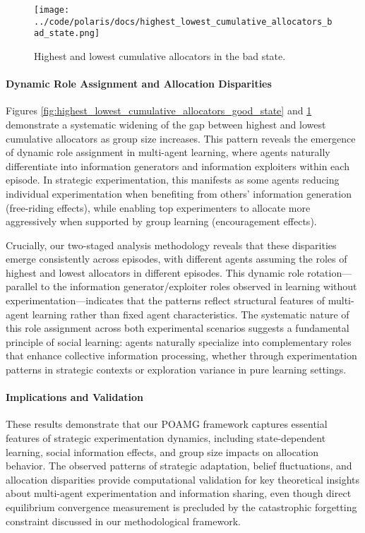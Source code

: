 \begin{figure}[!htbp]
    \centering
    \texttt{[image: ../code/polaris/docs/highest\_lowest\_cumulative\_allocators\_bad\_state.png]}
    \caption{Highest and lowest cumulative allocators in the bad state.}
    \label{fig:highest_lowest_cumulative_allocators_bad_state}
\end{figure}
\paragraph{Dynamic Role Assignment and Allocation Disparities} Figures \ref{fig:highest_lowest_cumulative_allocators_good_state} and \ref{fig:highest_lowest_cumulative_allocators_bad_state} demonstrate a systematic widening of the gap between highest and lowest cumulative allocators as group size increases. This pattern reveals the emergence of dynamic role assignment in multi-agent learning, where agents naturally differentiate into information generators and information exploiters within each episode. In strategic experimentation, this manifests as some agents reducing individual experimentation when benefiting from others' information generation (free-riding effects), while enabling top experimenters to allocate more aggressively when supported by group learning (encouragement effects).

Crucially, our two-staged analysis methodology reveals that these disparities emerge consistently across episodes, with different agents assuming the roles of highest and lowest allocators in different episodes. This dynamic role rotation—parallel to the information generator/exploiter roles observed in learning without experimentation—indicates that the patterns reflect structural features of multi-agent learning rather than fixed agent characteristics. The systematic nature of this role assignment across both experimental scenarios suggests a fundamental principle of social learning: agents naturally specialize into complementary roles that enhance collective information processing, whether through experimentation patterns in strategic contexts or exploration variance in pure learning settings.

\paragraph{Implications and Validation} These results demonstrate that our POAMG framework captures essential features of strategic experimentation dynamics, including state-dependent learning, social information effects, and group size impacts on allocation behavior. The observed patterns of strategic adaptation, belief fluctuations, and allocation disparities provide computational validation for key theoretical insights about multi-agent experimentation and information sharing, even though direct equilibrium convergence measurement is precluded by the catastrophic forgetting constraint discussed in our methodological framework.

